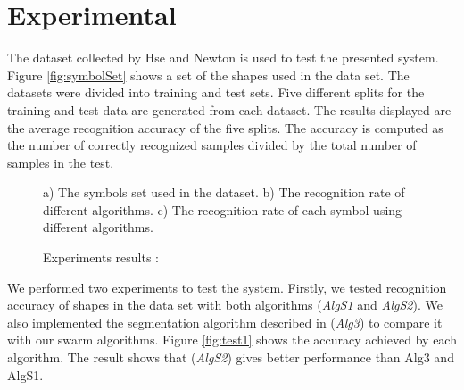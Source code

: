\documentclass{article}
\begin{document}
\section{Experimental}
\label{sec:Experiments}
 
The dataset collected by Hse and Newton\cite{HeloiseBeautification} is used to test the presented system.  Figure \ref{fig:symbolSet} shows a set of the shapes used in the data set. The datasets were divided into training and test sets. Five different splits for the training and test data are generated from each dataset. The results displayed are the average recognition accuracy of the five splits. The accuracy is computed as the number of correctly recognized samples divided by the total number of samples in the test.
 \begin{figure*}[]
	\centering
	\begin{minipage}[b]{5cm}	
\begin{center}
		
		\end{center}
		\end{minipage}
		\hfill
	\caption{Experiments results :} a) The symbols set used in the dataset.   b) The recognition rate of different algorithms.  c) The recognition rate of each symbol using different algorithms. 
\end{figure*} 
We performed two experiments to test the system. Firstly, we tested recognition accuracy of shapes in the data set with both algorithms (\textsl{AlgS1} and \textsl{AlgS2}). We also implemented the segmentation algorithm described in \cite{earlyprocess} (\textsl{Alg3}) to compare it with our swarm algorithms. Figure \ref{fig:test1} shows the accuracy achieved by each algorithm. The result shows that (\textsl{AlgS2}) gives better performance than Alg3 and AlgS1. 
  
\end{document}
